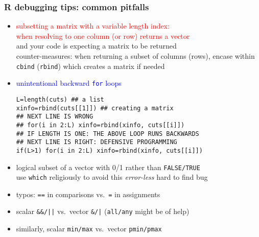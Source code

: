 \documentclass[11pt,pdftex,dvipsnames,usenames,helvetica]{beamer}
\begin{document}
\begin{frame}[fragile]
\frametitle{R debugging tips: common pitfalls}
\begin{itemize}
\item \textcolor{red}{subsetting a matrix with a variable length index:\\
    when resolving to one column (or row) returns a vector}\\
  and your code is expecting a matrix to be returned\\
  counter-measures: when returning a subset of columns (rows), encase
  within {\tt cbind} ({\tt rbind}) which creates a matrix if needed
\item \textcolor{blue}{unintentional backward {\tt for} loops}\\
\begin{verbatim}
L=length(cuts) ## a list
xinfo=rbind(cuts[[1]]) ## creating a matrix
## NEXT LINE IS WRONG
## for(i in 2:L) xinfo=rbind(xinfo, cuts[[i]])
## IF LENGTH IS ONE: THE ABOVE LOOP RUNS BACKWARDS
## NEXT LINE IS RIGHT: DEFENSIVE PROGRAMMING
if(L>1) for(i in 2:L) xinfo=rbind(xinfo, cuts[[i]])
\end{verbatim}
\item logical subset of a vector with 0/1 rather than {\tt FALSE/TRUE}\\
  use {\tt which} religiously to avoid this {\it error-less} hard to find bug
\item typos: {\tt ==} in comparisons vs.\ {\tt =} in assignments
\item scalar {\tt \&\&/||} vs.\ vector {\tt \&/|} 
({\tt all/any} might be of help)
\item similarly, scalar {\tt min/max} vs.\ vector {\tt pmin/pmax}
\end{itemize}

\end{frame}
\end{document}
